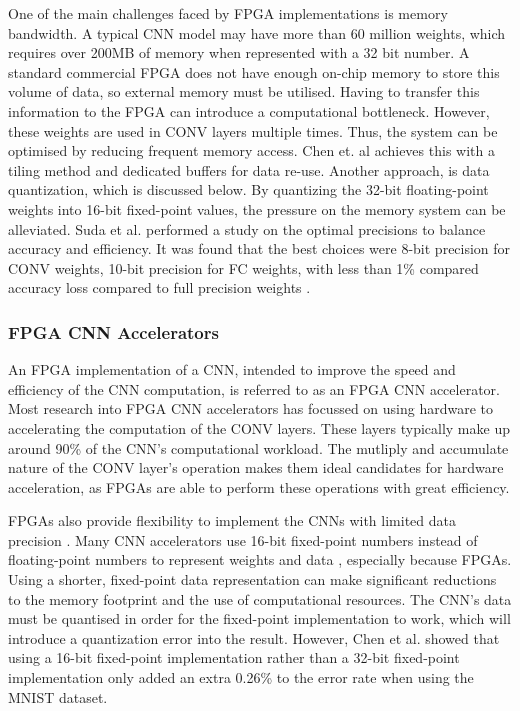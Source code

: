 \documentclass[12pt]{article}
\begin{document}
One of the main challenges faced by FPGA implementations is memory bandwidth. A typical CNN model may have more than 60 million weights, which requires over 200MB of memory when represented with a 32 bit number. A standard commercial FPGA does not have enough on-chip memory to store this volume of data, so external memory must be utilised. Having to transfer this information to the FPGA can introduce a computational bottleneck. However, these weights are used in CONV layers multiple times. Thus, the system can be optimised by reducing frequent memory access. Chen et. al achieves this with a tiling method and dedicated buffers for data re-use. Another approach, is data quantization, which is discussed below. By quantizing the 32-bit floating-point weights into 16-bit fixed-point values, the pressure on the memory system can be alleviated. Suda et al. performed a study on the optimal precisions to balance accuracy and efficiency. It was found that the best choices were 8-bit precision for CONV weights, 10-bit precision for FC weights, with less than 1\% compared accuracy loss compared to full precision weights \cite{SudaFpgaAccelerator}.

\subsubsection{FPGA CNN Accelerators}
\label{sec:Background-FpgaCnnImpl-Accel}
\vspace{-12pt}

An FPGA implementation of a CNN, intended to improve the speed and efficiency of the CNN computation, is referred to as an FPGA CNN accelerator. Most research into FPGA CNN accelerators has focussed on using hardware to accelerating the computation of the CONV layers. These layers typically make up around 90\% of the CNN's computational workload. The mutliply and accumulate nature of the CONV layer's operation makes them ideal candidates for hardware acceleration, as FPGAs are able to perform these operations with great efficiency. 

FPGAs also provide flexibility to implement the CNNs with limited data precision \cite{SudaFpgaAccelerator}. Many CNN accelerators use 16-bit fixed-point numbers instead of floating-point numbers to represent weights and data \cite{ZhangFpgaAccelerator}\cite{ChenFpgaAccelerator}\cite{FarabetFpgaAccelerator}, especially because FPGAs. Using a shorter, fixed-point data representation can make significant reductions to the memory footprint and the use of computational resources. The CNN's data must be quantised in order for the fixed-point implementation to work, which will introduce a quantization error into the result. However, Chen et al. showed that using a 16-bit fixed-point implementation rather than a 32-bit fixed-point implementation only added an extra 0.26\% to the error rate when using the MNIST dataset.
\end{document}
